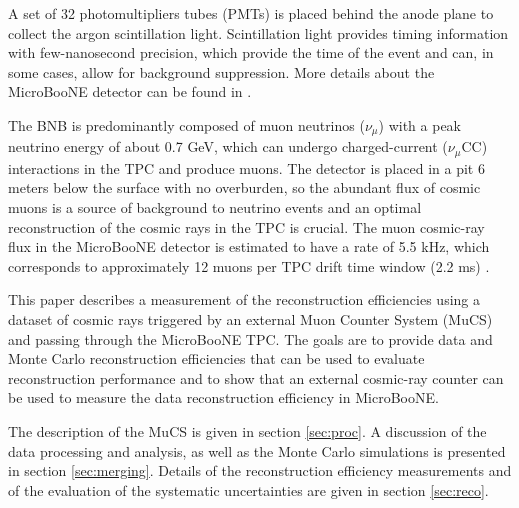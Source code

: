 \documentclass[a4paper,11pt]{article}
\begin{document}
A set of 32 photomultipliers tubes (PMTs) is placed behind the anode plane to collect the argon scintillation light. Scintillation light provides timing information with few-nanosecond precision, which provide the time of the event and can, in some cases, allow for background suppression. More details about the MicroBooNE detector can be found in \cite{detector}.

The BNB is predominantly composed of muon neutrinos ($\nu_{\mu}$) with a peak neutrino energy of about 0.7 GeV, which can undergo charged-current ($\nu_{\mu}$CC) interactions in the TPC and produce muons. The detector is placed in a pit 6 meters below the surface with no overburden, so the abundant flux of cosmic muons is a source of background to neutrino events and an optimal reconstruction of the cosmic rays in the TPC is crucial. The muon cosmic-ray flux in the MicroBooNE detector is estimated to have a  rate of 5.5 kHz, which corresponds to approximately 12 muons per TPC drift time window (2.2 ms) \cite{cosmic}.

This paper describes a measurement of the reconstruction efficiencies using a dataset of cosmic rays triggered by an external Muon Counter System (MuCS) and passing through the MicroBooNE TPC. The goals are to provide data and Monte Carlo reconstruction efficiencies that can be used to evaluate reconstruction performance and to show that an external cosmic-ray counter can be used to measure the data reconstruction efficiency in MicroBooNE.

The description of the MuCS is given in section \ref{sec:proc}. A discussion of the data processing and analysis, as well as the Monte Carlo simulations is presented in section \ref{sec:merging}. Details of the reconstruction efficiency measurements and of the evaluation of the systematic uncertainties are given in section \ref{sec:reco}.


\end{document}
